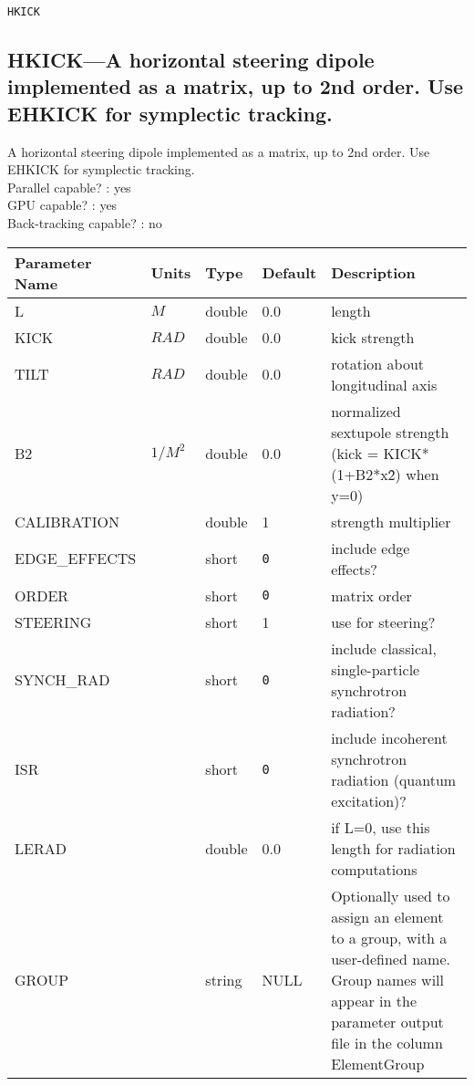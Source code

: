 \vspace*{0.5in}

\newpage
\begin{center}{\Large\verb|HKICK|}\end{center}
\subsection{HKICK---A horizontal steering dipole implemented as a matrix, up to 2nd order. Use EHKICK for symplectic tracking.}
A horizontal steering dipole implemented as a matrix, up to 2nd order. Use EHKICK for symplectic tracking.
\\
Parallel capable? : yes\\
GPU capable? : yes\\
Back-tracking capable? : no\\
\begin{tabular}{|l|l|l|l|p{\descwidth}|} \hline
Parameter Name & Units & Type & Default & Description \\ \hline 
L & $M$ & double &  0.0 & length  \\ \hline 
KICK & $RAD$ & double &  0.0 & kick strength  \\ \hline 
TILT & $RAD$ & double &  0.0 & rotation about longitudinal axis  \\ \hline 
B2 & $1/M^{2}$ & double &  0.0 & normalized sextupole strength (kick = KICK*(1+B2*x\^2) when y=0)  \\ \hline 
CALIBRATION &  & double &   1 & strength multiplier  \\ \hline 
EDGE\_EFFECTS &  & short &  \verb|0| & include edge effects?  \\ \hline 
ORDER &  & short &  \verb|0| & matrix order  \\ \hline 
STEERING &  & short &   1               & use for steering?  \\ \hline 
SYNCH\_RAD &  & short &  \verb|0| & include classical, single-particle synchrotron radiation?  \\ \hline 
ISR &  & short &  \verb|0| & include incoherent synchrotron radiation (quantum excitation)?  \\ \hline 
LERAD &  & double &  0.0 & if L=0, use this length for radiation computations  \\ \hline 
GROUP &  & string & NULL & Optionally used to assign an element to a group, with a user-defined name.  Group names will appear in the parameter output file in the column ElementGroup  \\ \hline 
\end{tabular}

